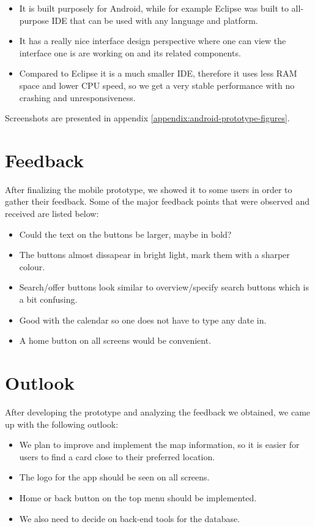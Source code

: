 \documentclass[11pt,twoside,a4paper]{report}
\begin{document}
\begin{itemize}
\item It is built purposely for Android, while for example Eclipse was built to all-purpose IDE that can be used with any language and platform.
\item It has a really nice interface design perspective where one can view the interface one is are working on and its related components.
\item Compared to Eclipse it is a much smaller IDE, therefore it uses less RAM space and lower CPU speed, so we get a very stable performance with no crashing and unresponsiveness.
\end{itemize}

Screenshots are presented in appendix \ref{appendix:android-prototype-figures}.

\section{Feedback}

After finalizing the mobile prototype, we showed it to some users in order to gather their feedback. Some of the major feedback points that were observed and received are listed below:

\begin{itemize}
\item Could the text on the buttons be larger, maybe in bold?
\item The buttons almost dissapear in bright light, mark them with a sharper colour.
\item Search/offer buttons look similar to overview/specify search buttons which is a bit confusing.
\item Good with the calendar so one does not have to type any date in.
\item A home button on all screens would be convenient.
\end{itemize}

\section{Outlook}

After developing the prototype and analyzing the feedback we obtained, we came up with the following outlook:

\begin{itemize}
\item We plan to improve and implement the map information, so it is easier for users to find a card close to their preferred location.
\item The logo for the app should be seen on all screens.
\item Home or back button on the top menu should be implemented.
\item We also need to decide on back-end tools for the database.
\end{itemize}
\end{document}
